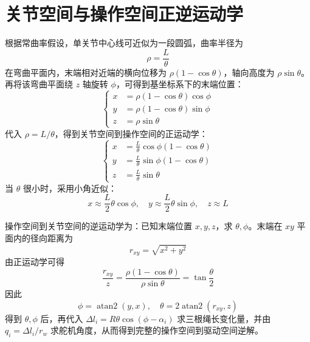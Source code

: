 \documentclass[UTF8,zihao=-4,oneside]{ctexrep}
\begin{document}
\section{关节空间与操作空间正逆运动学}

根据常曲率假设，单关节中心线可近似为一段圆弧，曲率半径为
\begin{equation}
  \rho=\frac{L}{\theta}
\end{equation}
在弯曲平面内，末端相对近端的横向位移为 \(\rho(1-\cos\theta)\)，轴向高度为 \(\rho\sin\theta\)。再将该弯曲平面绕 \(z\) 轴旋转 \(\phi\)，可得到基坐标系下的末端位置：
\begin{equation}
  \left\{
  \begin{aligned}
    x &= \rho(1-\cos\theta)\cos\phi\\
    y &= \rho(1-\cos\theta)\sin\phi\\
    z &= \rho\sin\theta
  \end{aligned}
  \right.
\end{equation}
代入 \(\rho=L/\theta\)，得到关节空间到操作空间的正运动学：
\begin{equation}
  \left\{
  \begin{aligned}
    x &= \frac{L}{\theta}\cos\phi(1-\cos\theta)\\
    y &= \frac{L}{\theta}\sin\phi(1-\cos\theta)\\
    z &= \frac{L}{\theta}\sin\theta
  \end{aligned}
  \right.
\end{equation}
当 \(\theta\) 很小时，采用小角近似：
\begin{equation}
  x \approx \frac{L}{2}\theta\cos\phi,\quad
  y \approx \frac{L}{2}\theta\sin\phi,\quad
  z \approx L
\end{equation}

操作空间到关节空间的逆运动学为：已知末端位置 \(x,y,z\)，求 \(\theta,\phi\)。末端在 \(xy\) 平面内的径向距离为
\begin{equation}
  r_{xy}=\sqrt{x^2+y^2}
\end{equation}
由正运动学可得
\begin{equation}
  \frac{r_{xy}}{z}=\frac{\rho(1-\cos\theta)}{\rho\sin\theta}
  =\tan\frac{\theta}{2}
\end{equation}
因此
\begin{equation}
  \phi=\operatorname{atan2}(y,x),\quad
  \theta=2\operatorname{atan2}(r_{xy},z)
\end{equation}
得到 \(\theta,\phi\) 后，再代入 \(\Delta l_i=R\theta\cos(\phi-\alpha_i)\) 求三根绳长变化量，并由 \(q_i=\Delta l_i/r_w\) 求舵机角度，从而得到完整的操作空间到驱动空间逆解。
\end{document}
